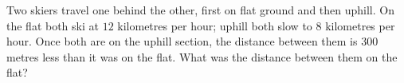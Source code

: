 Two skiers travel one behind the other, first on flat ground and then uphill. On the flat both ski at $12$ kilometres per hour; uphill both slow to $8$ kilometres per hour. Once both are on the uphill section, the distance between them is $300$ metres less than it was on the flat. What was the distance between them on the flat?
